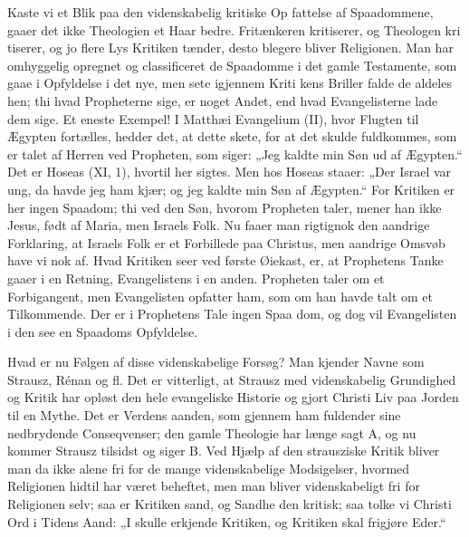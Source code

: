 \documentclass[12pt]{book}
\newcommand{\opage}[1]{\marginnote{\footnotesize\textit{[#1]}}}
\begin{document}
Kaste vi et Blik paa den videnskabelig kritiske Op\-%
fattelse af Spaadommene, gaaer det ikke Theologien et
Haar bedre. Fritænkeren kritiserer, og Theologen kri\-%
tiserer, og jo flere Lys Kritiken tænder, desto blegere
bliver Religionen. Man har omhyggelig opregnet og
classificeret de Spaadomme i det gamle Testamente, som
gaae i Opfyldelse i det nye, men sete igjennem Kriti\-%
kens Briller falde de aldeles hen; thi hvad Propheterne
sige, er noget Andet, end hvad Evangelisterne lade dem
sige. Et eneste Exempel! I Matthæi Evangelium (II),
hvor Flugten til Ægypten fortælles, hedder det, at dette
skete, for at det skulde fuldkommes, som er talet af
Herren ved Propheten, som siger: „Jeg kaldte min Søn
ud af Ægypten.“ Det er Hoseas (XI, 1), hvortil her
sigtes. Men hos Hoseas staaer: „Der Israel var ung,
da havde jeg ham kjær; og jeg kaldte min Søn af
Ægypten.“ For Kritiken er her ingen Spaadom; thi
ved den Søn, hvorom Propheten taler, mener han ikke
Jesus, født af Maria, men Israels Folk. Nu faaer man
rigtignok den aandrige Forklaring, at Israels Folk er et
Forbillede paa Christus, men aandrige Omsvøb have
vi nok af. Hvad Kritiken seer ved første Øiekast, er,
at Prophetens Tanke gaaer i en Retning, Evangelistens
i en anden. Propheten taler om et Forbigangent, men
\opage{88}\setcounter{footnote}{0}%
Evangelisten opfatter ham, som om han havde talt om
et Tilkommende. Der er i Prophetens Tale ingen Spaa\-%
dom, og dog vil Evangelisten i den see en Spaadoms
Opfyldelse.

Hvad er nu Følgen af disse videnskabelige Forsøg?
Man kjender Navne som Strausz, Rénan og fl. Det er
vitterligt, at Strausz med videnskabelig Grundighed og
Kritik har opløst den hele evangeliske Historie og gjort
Christi Liv paa Jorden til en Mythe. Det er Verdens\-%
aanden, som gjennem ham fuldender sine nedbrydende
Conseqvenser; den gamle Theologie har længe sagt A, og
nu kommer Strausz tilsidst og siger B. Ved Hjælp af den
strausziske Kritik bliver man da ikke alene fri for de
mange videnskabelige Modsigelser, hvormed Religionen
hidtil har været beheftet, men man bliver videnskabeligt
fri for Religionen selv; saa er Kritiken sand, og Sandhe\-%
den kritisk; saa tolke vi Christi Ord i Tidens Aand:
„I skulle erkjende Kritiken, og Kritiken skal frigjøre
Eder.“
\end{document}
